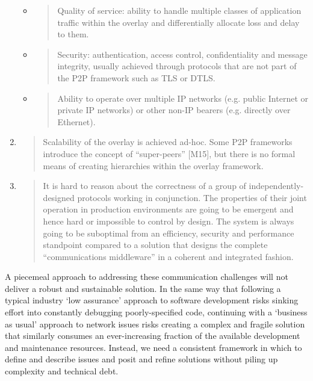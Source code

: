 \documentclass[11pt,a4paper]{article}
\begin{document}
\begin{enumerate}
  \begin{itemize}
  \item
    \begin{quote}
    Quality of service: ability to handle multiple classes of
    application traffic within the overlay and differentially allocate
    loss and delay to them.
    \end{quote}
  \item
    \begin{quote}
    Security: authentication, access control, confidentiality and
    message integrity, usually achieved through protocols that are not
    part of the P2P framework such as TLS or DTLS.
    \end{quote}
  \item
    \begin{quote}
    Ability to operate over multiple IP networks (e.g. public Internet
    or private IP networks) or other non-IP bearers (e.g. directly over
    Ethernet).
    \end{quote}
  \end{itemize}
\item
  \begin{quote}
  Scalability of the overlay is achieved ad-hoc. Some P2P frameworks
  introduce the concept of ``super-peers'' {[}M15{]}, but there is no
  formal means of creating hierarchies within the overlay framework.
  \end{quote}
\item
  \begin{quote}
  It is hard to reason about the correctness of a group of
  independently-designed protocols working in conjunction. The
  properties of their joint operation in production environments are
  going to be emergent and hence hard or impossible to control by
  design. The system is always going to be suboptimal from an
  efficiency, security and performance standpoint compared to a solution
  that designs the complete ``communications middleware'' in a coherent
  and integrated fashion.
  \end{quote}
\end{enumerate}

A piecemeal approach to addressing these communication challenges will
not deliver a robust and sustainable solution. In the same way that
following a typical industry `low assurance' approach to software
development risks sinking effort into constantly debugging
poorly-specified code, continuing with a `business as usual' approach to
network issues risks creating a complex and fragile solution that
similarly consumes an ever-increasing fraction of the available
development and maintenance resources. Instead, we need a consistent
framework in which to define and describe issues and posit and refine
solutions without piling up complexity and technical debt.
\end{document}
